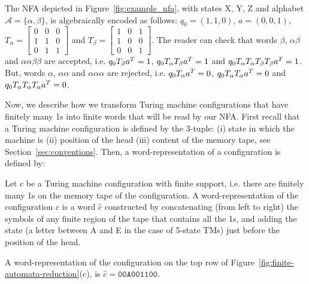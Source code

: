 \begin{example}\label{ex:nfa}
  The NFA depicted in Figure~\ref{fig:example_nfa}, with states X, Y, Z and alphabet $\mathcal{A}=\{\alpha,\beta\}$, is algebraically encoded as follows: $q_0 = (1,1,0)$, $a=(0,0,1)$, $T_\alpha=\begin{bmatrix}
      0 & 0 & 0 \\
      1 & 1 & 0 \\
      0 & 1 & 1
    \end{bmatrix}$ and $T_\beta= \begin{bmatrix}
      1 & 0 & 1 \\
      1 & 0 & 0 \\
      0 & 0 & 1
    \end{bmatrix}$. The reader can check that words $\beta$, $\alpha\beta$ and $\alpha\alpha\beta\beta$ are accepted, i.e. $q_0T_\beta a^T = 1$, $q_0T_\alpha T_\beta a^T = 1$ and $q_0T_\alpha T_\alpha T_\beta T_\beta a ^T = 1$. But, words $\alpha$, $\alpha\alpha$ and $\alpha\alpha\alpha$ are rejected, i.e. $q_0T_\alpha a^T = 0$, $q_0T_\alpha T_\alpha a^T = 0$ and $q_0T_\alpha T_\alpha T_\alpha a ^T = 0$.
\end{example}


Now, we describe how we transform Turing machine configurations that have finitely many 1s into finite words that will be read by our NFA. First recall that a Turing machine configuration is defined by the 3-tuple: (i) state in which the machine is (ii) position of the head (iii) content of the memory tape, see Section~\ref{sec:conventions}. Then, a word-representation of a configuration is defined by:

\begin{definition}\label{def:wordc}
  Let $c$ be a Turing machine configuration with finite support, i.e. there are finitely many 1s on the memory tape of the configuration. A word-representation of the configuration $c$ is a word $\hat{c}$ constructed by concatenating (from left to right) the symbols of any finite region of the tape that contains all the 1s, and adding the state (a letter between A and E in the case of 5-state TMs) just before the position of the head.
\end{definition}

\begin{example}
  A word-representation of the configuration on the top row of Figure~\ref{fig:finite-automata-reduction}(c), is $\hat{c} = \texttt{00A001100}$.
\end{example}

